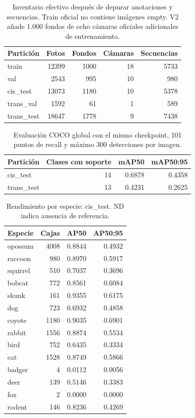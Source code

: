 \begin{table}[H]
\centering\small
\caption{Inventario efectivo después de depurar anotaciones y secuencias. Train oficial no contiene imágenes empty. V2 añade 1.000 fondos de ocho cámaras oficiales adicionales de entrenamiento.}
\begin{tabular}{lrrrr}
\toprule
Partición & Fotos & Fondos & Cámaras & Secuencias \\
\midrule
train & 12399 & 1000 & 18 & 5733 \\
val & 2543 & 995 & 10 & 980 \\
cis\_test & 13073 & 1180 & 10 & 5378 \\
trans\_val & 1592 & 61 & 1 & 589 \\
trans\_test & 18647 & 1778 & 9 & 7438 \\
\bottomrule
\end{tabular}
\end{table}

\begin{table}[H]
\centering\small
\caption{Evaluación COCO global con el mismo checkpoint, 101 puntos de recall y máximo 300 detecciones por imagen.}
\begin{tabular}{lrrr}
\toprule
Partición & Clases con soporte & mAP50 & mAP50:95 \\
\midrule
cis\_test & 14 & 0.6878 & 0.4358 \\
trans\_test & 13 & 0.4231 & 0.2625 \\
\bottomrule
\end{tabular}
\end{table}

\begin{table}[H]
\centering\small
\caption{Rendimiento por especie: cis\_test. ND indica ausencia de referencia.}
\begin{tabular}{lrrr}
\toprule
Especie & Cajas & AP50 & AP50:95 \\
\midrule
opossum & 4008 & 0.8844 & 0.4932 \\
raccoon & 980 & 0.8970 & 0.5917 \\
squirrel & 510 & 0.7037 & 0.3696 \\
bobcat & 772 & 0.8561 & 0.6084 \\
skunk & 161 & 0.9355 & 0.6175 \\
dog & 723 & 0.6932 & 0.4858 \\
coyote & 1180 & 0.9035 & 0.6901 \\
rabbit & 1556 & 0.8874 & 0.5534 \\
bird & 752 & 0.6435 & 0.3334 \\
cat & 1528 & 0.8749 & 0.5866 \\
badger & 4 & 0.0112 & 0.0056 \\
deer & 139 & 0.5146 & 0.3383 \\
fox & 2 & 0.0000 & 0.0000 \\
rodent & 146 & 0.8236 & 0.4269 \\
\bottomrule
\end{tabular}
\end{table}

